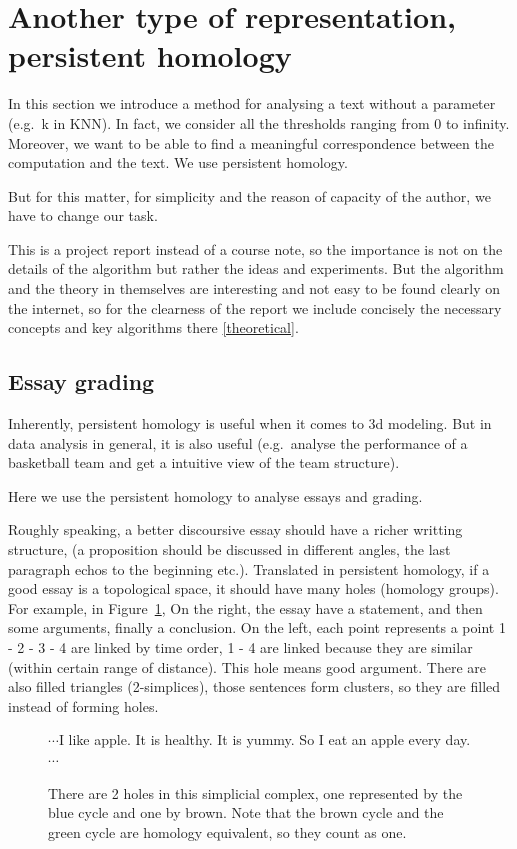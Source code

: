 \section{Another type of representation, persistent homology}

In this section we introduce a method for analysing a text
without a parameter (e.g.\ k in KNN). In fact, we consider all
the thresholds ranging from 0 to infinity. Moreover, we want to be able to
find a meaningful correspondence between the computation and
the text. We use persistent homology.

But for this matter, for simplicity and the reason of capacity
of the author, we have to change our task.

This is a project report instead of a course note, so the importance
is not on the details of the algorithm but rather the ideas and experiments.
But the algorithm and the theory in themselves are interesting and not
easy to be found clearly on the internet, so for the clearness of the report
we include concisely the necessary
concepts and key algorithms there \ref{theoretical}.

\subsection{Essay grading}

Inherently, persistent homology is useful when it comes to 3d modeling.
But in data analysis in general, it is also useful (e.g.\ analyse the
performance of a basketball team and get a intuitive view of the team structure).

Here we use the persistent homology to analyse essays and grading.

Roughly speaking, a better discoursive essay should have a
richer writting structure, (a proposition should be discussed
in different angles, the last paragraph echos to the beginning etc.).
Translated in persistent homology,
if a good essay is a topological space, it should have
many holes (homology groups). For example,
in Figure~\ref{apple}, On the right, the essay have a statement, and then some arguments,
finally a conclusion.
On the left, each point represents a point
1 - 2 - 3 - 4 are linked by time order, 1 - 4 are linked because they are similar (within certain range of distance).
This hole means good argument. There are also filled triangles (2-simplices), those
sentences form clusters, so they are filled instead of forming holes.

\begin{figure}[H]
  \begin{minipage}{0.80\textwidth}
  
  \end{minipage}
  \begin{minipage}{0.19\textwidth}
  $\cdots$I like apple. It is healthy. It is yummy. So I eat an apple every day.
  $\cdots$
  \end{minipage}
  \caption{There are 2 holes in this simplicial complex,
  one represented by the blue cycle and one by brown.
  Note that the brown cycle and the green cycle are homology equivalent, so they count as one.}
  \label{apple}
\end{figure}

